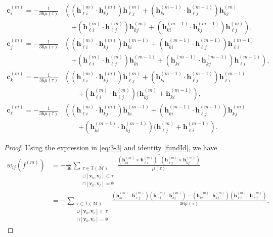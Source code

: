 \documentclass[onefignum,onetabnum]{siamonline220329}
\numberwithin{equation}{section}
\def\c{\mathbf{c}}
\def\h{\mathbf{h}}
\def\bv{\mathbf{v}}
\begin{document}
\begin{sloppypar}
\begin{lemma}
\begin{subequations}
\begin{align}
\c_i^{(m)}=-\frac{1}{36 \mu(\tau)}
&\left((\h_{{\ell}i}^{(m)}\cdot\h_{kj}^{(m)})\h_{{\ell}j}^{(m)}
+(\h_{ki}^{(m-1)}\cdot\h_{{\ell}j}^{(m-1)})\h_{kj}^{(m)}\right. \nonumber \\
&\quad\left.+(\h_{{\ell}i}^{(m)}\cdot\h_{{\ell}j}^{(m)})\h_{kj}^{(m)}
+(\h_{ki}^{(m-1)}\cdot\h_{kj}^{(m-1)})\h_{{\ell}j}^{(m)}\right),\\
%
\c_j^{(m)}=-\frac{1}{36 \mu(\tau)}
&\left((\h_{{\ell}i}^{(m)}\cdot\h_{kj}^{(m)})\h_{ki}^{(m-1)}
+(\h_{ki}^{(m-1)}\cdot\h_{{\ell}j}^{(m-1)})\h_{{\ell}i}^{(m-1)}\right. \nonumber \\
&\quad\left.+(\h_{{\ell}i}^{(m)}\cdot\h_{{\ell}j}^{(m)})\h_{ki}^{(m-1)}
+(\h_{ki}^{(m-1)}\cdot\h_{kj}^{(m-1)})\h_{{\ell}i}^{(m-1)}\right), \\
%
\c_k^{(m)}=-\frac{1}{36 \mu(\tau)}
&\left((\h_{{\ell}i}^{(m)}\cdot\h_{kj}^{(m)})\h_{{\ell}j}^{(m)}
+(\h_{ki}^{(m-1)}\cdot\h_{{\ell}j}^{(m-1)})\h_{{\ell}i}^{(m-1)}\right. \nonumber \\
&\quad\quad\left.+(\h_{{\ell}i}^{(m)}\cdot\h_{{\ell}j}^{(m)})(\h_{kj}^{(m)}+\h_{ki}^{(m-1)}\right), \\
%
\c_{\ell}^{(m)}=-\frac{1}{36 \mu(\tau)}
&\left((\h_{{\ell}i}^{(m)}\cdot\h_{kj}^{(m)})\h_{ki}^{(m-1)}
+(\h_{ki}^{(m-1)}\cdot\h_{{\ell}j}^{(m-1)})\h_{kj}^{(m)}\right. \nonumber \\
&\quad\quad\left.+(\h_{ki}^{(m-1)}\cdot\h_{kj}^{(m-1)})(\h_{{\ell}j}^{(m)}+\h_{{\ell}i}^{(m-1)}\right).
\end{align}
\end{subequations}
\end{lemma}
\begin{proof}
Using the expression in \eqref{eq:3-3} and identity \eqref{fundId}, we have
\begin{align*}
w_{ij}(f^{(m)})
&=-\frac{1}{36}\sum_{\substack{\tau\in\mathbb{T}(\mathcal{M})\\ [\bv_i,\bv_j]\cup[\bv_k, \bv_{\ell}]\subset\tau\\ [\bv_i,\bv_j]\cap[\bv_k, \bv_{\ell}]=\emptyset}}
\frac{(\h_{k i}^{(m)}\times \h_{\ell i}^{(m)} )^{\top} (\h_{\ell j}^{(m)}  \times \h_{k j}^{(m)})}{\mu(\tau)} \nonumber \\
%
&=- \sum_{\substack{\tau\in\mathbb{T}(\mathcal{M})\\ [\bv_i,\bv_j]\cup[\bv_k, \bv_{\ell}]\subset\tau\\ [\bv_i,\bv_j]\cap[\bv_k, \bv_{\ell}]=\emptyset}}
\frac{(\h_{k i}^{(m)} \cdot \h_{\ell j}^{(m)} ) ( \h_{\ell i}^{(m)} \cdot \h_{k j}^{(m)} ) - (\h_{k i}^{(m)} \cdot \h_{k j}^{(m)} ) ( \h_{\ell i}^{(m)} \cdot \h_{\ell j}^{(m)} )}{36 \mu(\tau)} \label{eq:1st_term_wij}. 

\end{align*}
\end{proof}
\end{sloppypar}
\end{document}

